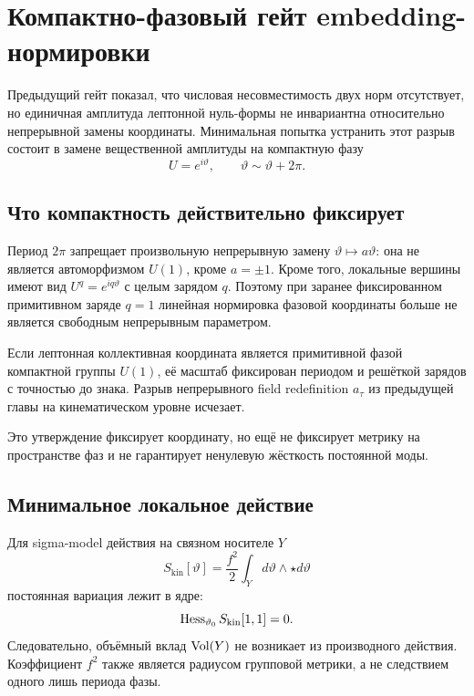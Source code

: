 \chapter{Компактно-фазовый гейт embedding-нормировки}

Предыдущий гейт показал, что числовая несовместимость двух норм отсутствует,
но единичная амплитуда лептонной нуль-формы не инвариантна относительно
непрерывной замены координаты. Минимальная попытка устранить этот разрыв
состоит в замене вещественной амплитуды на компактную фазу
\begin{equation}
 U=e^{i\vartheta},
 \qquad
 \vartheta\sim\vartheta+2\pi.
\end{equation}

\section{Что компактность действительно фиксирует}

Период \(2\pi\) запрещает произвольную непрерывную замену
\(\vartheta\mapsto a\vartheta\): она не является автоморфизмом \(U(1)\),
кроме \(a=\pm1\). Кроме того, локальные вершины имеют вид
\(U^q=e^{iq\vartheta}\) с целым зарядом \(q\). Поэтому при заранее
фиксированном примитивном заряде \(q=1\) линейная нормировка фазовой
координаты больше не является свободным непрерывным параметром.

\begin{proposition}
Если лептонная коллективная координата является примитивной фазой
компактной группы \(U(1)\), её масштаб фиксирован периодом и решёткой
зарядов с точностью до знака. Разрыв непрерывного field redefinition
\(a_\tau\) из предыдущей главы на кинематическом уровне исчезает.
\end{proposition}

Это утверждение фиксирует координату, но ещё не фиксирует метрику на
пространстве фаз и не гарантирует ненулевую жёсткость постоянной моды.

\section{Минимальное локальное действие}

Для sigma-model действия на связном носителе \(Y\)
\begin{equation}
 S_{\mathrm{kin}}[\vartheta]
 =\frac{f^2}{2}\int_Y d\vartheta\wedge\star d\vartheta
\end{equation}
постоянная вариация лежит в ядре:
\begin{equation}
 \operatorname{Hess}_{\vartheta_0}S_{\mathrm{kin}}[1,1]=0.
\end{equation}
Следовательно, объёмный вклад \(\operatorname{Vol}(Y)\) не возникает из
производного действия. Коэффициент \(f^2\) также является радиусом
групповой метрики, а не следствием одного лишь периода фазы.

